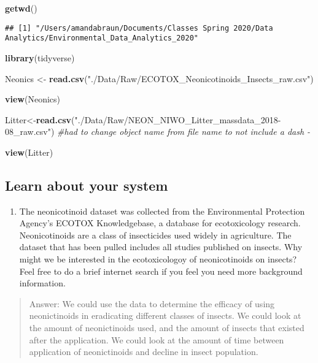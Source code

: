 \documentclass[]{article}
\newenvironment{Shaded}{\begin{snugshade}}{\end{snugshade}}
\newcommand{\CommentTok}[1]{\textcolor[rgb]{0.56,0.35,0.01}{\textit{#1}}}
\newcommand{\KeywordTok}[1]{\textcolor[rgb]{0.13,0.29,0.53}{\textbf{#1}}}
\newcommand{\NormalTok}[1]{#1}
\newcommand{\StringTok}[1]{\textcolor[rgb]{0.31,0.60,0.02}{#1}}
\providecommand{\tightlist}{%
  \setlength{\itemsep}{0pt}\setlength{\parskip}{0pt}}
\begin{document}
\begin{Shaded}
\begin{Highlighting}[]
\KeywordTok{getwd}\NormalTok{()}
\end{Highlighting}
\end{Shaded}

\begin{verbatim}
## [1] "/Users/amandabraun/Documents/Classes Spring 2020/Data Analytics/Environmental_Data_Analytics_2020"
\end{verbatim}

\begin{Shaded}
\begin{Highlighting}[]
\KeywordTok{library}\NormalTok{(tidyverse)}

\NormalTok{Neonics <-}\StringTok{ }\KeywordTok{read.csv}\NormalTok{(}\StringTok{"./Data/Raw/ECOTOX_Neonicotinoids_Insects_raw.csv"}\NormalTok{)}

\KeywordTok{view}\NormalTok{(Neonics)}

\NormalTok{Litter<-}\KeywordTok{read.csv}\NormalTok{(}\StringTok{"./Data/Raw/NEON_NIWO_Litter_massdata_2018-08_raw.csv"}\NormalTok{)}
\CommentTok{#had to change object name from file name to not include a dash -}

\KeywordTok{view}\NormalTok{(Litter)}
\end{Highlighting}
\end{Shaded}

\hypertarget{learn-about-your-system}{%
\subsection{Learn about your system}\label{learn-about-your-system}}

\begin{enumerate}
\def\labelenumi{\arabic{enumi}.}
\setcounter{enumi}{1}
\tightlist
\item
  The neonicotinoid dataset was collected from the Environmental
  Protection Agency's ECOTOX Knowledgebase, a database for ecotoxicology
  research. Neonicotinoids are a class of insecticides used widely in
  agriculture. The dataset that has been pulled includes all studies
  published on insects. Why might we be interested in the ecotoxicologoy
  of neonicotinoids on insects? Feel free to do a brief internet search
  if you feel you need more background information.
\end{enumerate}

\begin{quote}
Answer: We could use the data to determine the efficacy of using
neonictinoids in eradicating different classes of insects. We could look
at the amount of neonictinoids used, and the amount of insects that
existed after the application. We could look at the amount of time
between application of neonictinoids and decline in insect population.
\end{quote}
\end{document}
